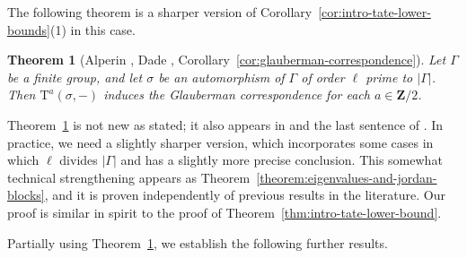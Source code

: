 \documentclass[reqno]{amsart}
\numberwithin{equation}{subsection}
\newcommand{\Z}{\mathbf{Z}}
\newcommand{\rT}{\ensuremath{\mathrm{T}}\xspace}
\newtheorem{thm}{Theorem}[subsection]
\theoremstyle{remark}
\numberwithin{equation}{subsection}
\numberwithin{figure}{subsection}
\begin{document}
The following theorem is a sharper version of Corollary~\ref{cor:intro-tate-lower-bounds}(1) in this case.

\begin{thm}[Alperin \cite{Alp76}, Dade \cite{Dade78}, Corollary~\ref{cor:glauberman-correspondence}]\label{thm:intro-glauberman}
    Let $\Gamma$ be a finite group, and let $\sigma$ be an automorphism of $\Gamma$ of order $\ell$ prime to $|\Gamma|$. Then $\rT^a(\sigma, -)$ induces the Glauberman correspondence for each $a \in \Z/2$.
\end{thm}

Theorem~\ref{thm:intro-glauberman} is not new as stated; it also appears in \cite{Alp76} and the last sentence of \cite{Dade78}. In practice, we need a slightly sharper version, which incorporates some cases in which $\ell$ divides $|\Gamma|$ and has a slightly more precise conclusion. This somewhat technical strengthening appears as Theorem~\ref{theorem:eigenvalues-and-jordan-blocks}, and it is proven independently of previous results in the literature. Our proof is similar in spirit to the proof of Theorem~\ref{thm:intro-tate-lower-bound}.


Partially using Theorem~\ref{thm:intro-glauberman}, we establish the following further results.
\end{document}
